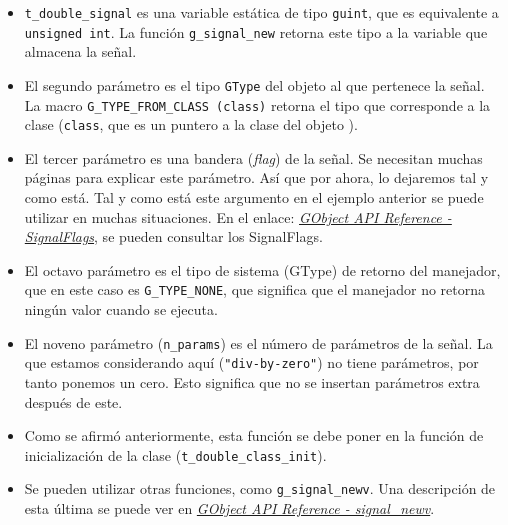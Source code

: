 \vspace{-\topsep}
\begin{itemize}
  \tightlist
\item \texttt{t\_double\_signal} es una variable estática de tipo \texttt{guint}, que es equivalente a \texttt{unsigned int}. La función \texttt{g\_signal\_new} retorna este tipo a la variable que almacena la señal. 
\item El segundo parámetro es el tipo \texttt{GType} del objeto al que pertenece la señal.
  La macro \texttt{G\_TYPE\_FROM\_CLASS (class)} retorna el tipo que corresponde a la
  clase (\texttt{class}, que es un puntero a la clase del objeto \footnotemark{}).
\item El tercer parámetro es una bandera (\emph{flag}) de la señal. Se necesitan muchas
  páginas para explicar este parámetro. Así que por ahora, lo dejaremos tal y como está.
  Tal y como está este argumento en el ejemplo anterior se puede utilizar en muchas
  situaciones. En el enlace:
  \href{https://docs.gtk.org/gobject/flags.SignalFlags.html}
  {\emph{\textsf{GObject API Reference  - SignalFlags}}},
  se pueden consultar los \textsf{SignalFlags}.
\item El octavo parámetro es el tipo de sistema (\textsf{GType}) de retorno del
  manejador, que en este caso es \texttt{G\_TYPE\_NONE}, que significa que el manejador
  no retorna ningún valor cuando se ejecuta.
\item El noveno parámetro (\texttt{n\_params}) es el número de parámetros de la señal.
  La que estamos considerando aquí (\texttt{"div-by-zero"}) no tiene parámetros, por
  tanto ponemos un cero.
  Esto significa que no se insertan parámetros extra después de este.
\item Como se afirmó anteriormente, esta función se debe poner en la función de
  inicialización de la clase (\texttt{t\_double\_class\_init}).
\item Se pueden utilizar otras funciones, como \texttt{g\_signal\_newv}. Una descripción
  de esta última se puede ver en
  \href{https://docs.gtk.org/gobject/func.signal_newv.html}
  {\emph{\textsf{GObject API Reference - signal\_newv}}}.      
\end{itemize}

